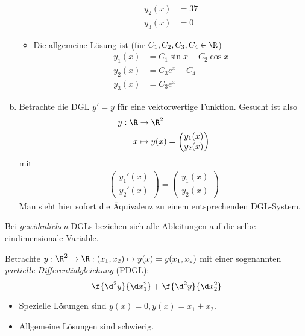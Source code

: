 \documentclass[
]{mycourse}
\begin{document}
\begin{ex}
\begin{enumerate}[a)]
\begin{itemize}
\begin{align*}
						y_2(x) &= 37 \\
						y_3(x) &= 0
					\end{align*}
				\item
					Die allgemeine Lösung ist (für $C_1,C_2,C_3,C_4 \in \R$)
					\begin{align*}
						y_1(x) &= C_1 \sin x + C_2 \cos x \\
						y_2(x) &= C_3 e^x + C_4 \\
						y_3(x) &= C_3 e^x
					\end{align*}
			\end{itemize}
		\item
			Betrachte die DGL $y' = y$ für eine vektorwertige Funktion.
			Gesucht ist also
			\begin{align*}
				y: \R &\to \R^2 \\
				x &\mapsto y(x) = \begin{pmatrix}
					y_1(x) \\ y_2(x)
				\end{pmatrix}
			\end{align*}
			mit
			\begin{align*}
				\begin{pmatrix}
					y_1'(x) \\ y_2'(x)
				\end{pmatrix}
				=
				\begin{pmatrix}
					y_1(x) \\ y_2(x)
				\end{pmatrix}
			\end{align*}
			Man sieht hier sofort die Äquivalenz zu einem entsprechenden DGL-System.
	\end{enumerate}
\end{ex}

Bei \emph{gewöhnlichen} DGLs beziehen sich alle Ableitungen auf die selbe eindimensionale Variable.

\begin{ex} \label{1.2}
	Betrachte $y : \R^2 \to \R : (x_1,x_2) \mapsto y(x) = y(x_1,x_2)$ mit einer sogenannten \emph{partielle Differentialgleichung} (PDGL):
	\[
		\f{\d^2y}{\d x_1^2} + \f{\d^2 y}{\d x_2^2 }
	\]
	\begin{itemize}
		\item
			Spezielle Lösungen sind $y(x) = 0, y(x) = x_1 + x_2$.
		\item
			Allgemeine Lösungen sind schwierig.
	\end{itemize}
\end{ex}
\end{document}
